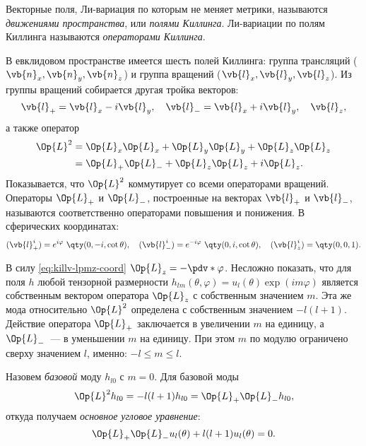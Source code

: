 \documentclass[\docroot/reports/draft/report.tex]{subfiles}
\begin{document}
    Векторные поля, Ли-вариация по которым не меняет метрики, называются \textit{движениями пространства}, или \textit{полями Киллинга}. Ли-вариации по полям Киллинга называются \textit{операторами Киллинга}.

    В евклидовом пространстве имеется шесть полей Киллинга: группа трансляций ($\vb{n}_x,\vb{n}_y,\vb{n}_z$) и группа вращений ($\vb{l}_x,\vb{l}_y,\vb{l}_z$). Из группы вращений собирается другая тройка векторов:
    \begin{equation}\label{eq:killv-lpmz}
        \vb{l}_{+} = \vb{l}_x - i \vb{l}_y, \quad
        \vb{l}_{-} = \vb{l}_x + i \vb{l}_y, \quad
        \vb{l}_z,
    \end{equation}
    а также оператор
    \begin{equation}\begin{aligned}\label{eq:killv-l2}
        \Op{L}^2 &= \Op{L}_x\Op{L}_x + \Op{L}_y\Op{L}_y + \Op{L}_z\Op{L}_z \\
                 &= \Op{L}_{+}\Op{L}_{-} + \Op{L}_z\Op{L}_z + i \Op{L}_z.
    \end{aligned}\end{equation}
    Показывается, что $\Op{L}^2$ коммутирует со всеми операторами вращений. Операторы $\Op{L}_{+}$ и $\Op{L}_{-}$, построенные на векторах $\vb{l}_{+}$ и $\vb{l}_{-}$, называются соответственно операторами повышения и понижения.
    В сферических координатах:
    \begin{equation}\label{eq:killv-lpmz-coord}
        (\vb{l}_{+}^i) = e^{i\varphi}\ \qty(0,-i,\cot\theta), \quad
        (\vb{l}_{-}^i) = e^{-i\varphi}\ \qty(0,i,\cot\theta), \quad
        (\vb{l}_z^i)   = \qty(0,0,1).
    \end{equation}

    В силу \autoref{eq:killv-lpmz-coord} $\Op{L}_z = -\pdv*{\varphi}$. Несложно показать, что для поля $h$ любой тензорной размерности $h_{lm}(\theta,\varphi) = u_l(\theta) \exp(im\varphi)$ является собственным вектором оператора $\Op{L}_z$ с собственным значением $m$. Эта же мода относительно $\Op{L}^2$ определена с собственным значением $-l(l+1)$. Действие оператора $\Op{L}_{+}$ заключается в увеличении $m$ на единицу, а $\Op{L}_{-}$~--- в уменьшении $m$ на единицу. При этом $m$ по модулю ограничено сверху значением $l$, именно: $-l \le m \le l$.

    Назовем \textit{базовой} моду $h_{l0}$ с $m = 0$. Для базовой моды
    \begin{equation*}
        \Op{L}^2 h_{l0} = - l(l+1) h_{l0} = \Op{L}_{+}\Op{L}_{-} h_{l0},
    \end{equation*}
    откуда получаем \textit{основное угловое уравнение}:
    \begin{equation}\label{eq:killeq-hl0}
        \Op{L}_{+}\Op{L}_{-} u_l(\theta) + l(l+1) u_l(\theta) = 0.
    \end{equation}
\end{document}
